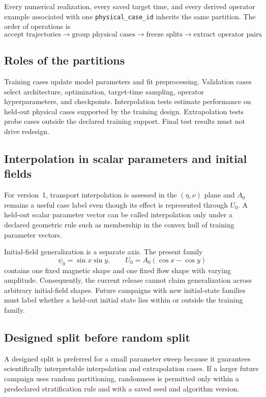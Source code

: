 \documentclass[11pt]{article}
\newcommand{\code}[1]{\texttt{#1}}
\begin{document}
Every numerical realization, every saved target time, and every derived operator example associated with one \code{physical\_case\_id} inherits the same partition. The order of operations is
\begin{equation}
\boxed{\text{accept trajectories}\rightarrow\text{group physical cases}\rightarrow\text{freeze splits}\rightarrow\text{extract operator pairs}}.
\end{equation}

\subsection{Roles of the partitions}
Training cases update model parameters and fit preprocessing. Validation cases select architecture, optimization, target-time sampling, operator hyperparameters, and checkpoints. Interpolation tests estimate performance on held-out physical cases supported by the training design. Extrapolation tests probe cases outside the declared training support. Final test results must not drive redesign.

\subsection{Interpolation in scalar parameters and initial fields}
For version~1, transport interpolation is assessed in the $(\eta,\nu)$ plane and $A_0$ remains a useful case label even though its effect is represented through $U_0$. A held-out scalar parameter vector can be called interpolation only under a declared geometric rule such as membership in the convex hull of training parameter vectors.

Initial-field generalization is a separate axis. The present family
\begin{equation}
\psi_0=\sin x\sin y,\qquad U_0=A_0(\cos x-\cos y)
\end{equation}
contains one fixed magnetic shape and one fixed flow shape with varying amplitude. Consequently, the current release cannot claim generalization across arbitrary initial-field shapes. Future campaigns with new initial-state families must label whether a held-out initial state lies within or outside the training family.

\subsection{Designed split before random split}
A designed split is preferred for a small parameter sweep because it guarantees scientifically interpretable interpolation and extrapolation cases. If a larger future campaign uses random partitioning, randomness is permitted only within a predeclared stratification rule and with a saved seed and algorithm version.
\end{document}
